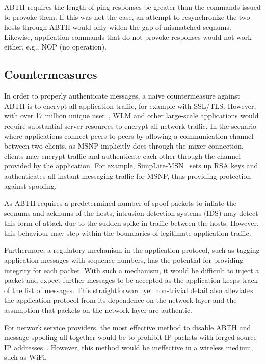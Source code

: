 \documentclass{sig-alternate}
\begin{document}
ABTH requires the length of ping responses be greater than the commands issued to provoke them.
If this was not the case, an attempt to resynchronize the two hosts through ABTH would only widen the gap of mismatched seqnums.
Likewise, application commands that do not provoke responses would not work either, e.g., NOP (no operation).

\subsection{Countermeasures}

In order to properly authenticate messages, a naive countermeasure against ABTH is to encrypt all application traffic, for example with SSL/TLS.
However, with over 17 million unique user~\cite{templeton:spoof}, WLM and other large-scale applications would require substantial server resources to encrypt all network traffic.
In the scenario where applications connect peers to peers by allowing a communication channel between two clients, as MSNP implicitly does through the mixer connection, clients may encrypt traffic and authenticate each other through the channel provided by the application.
For example, SimpLite-MSN~\cite{secway:url} sets up RSA keys and authenticates all instant messaging traffic for MSNP, thus providing protection against spoofing.

As ABTH requires a predetermined number of spoof packets to inflate the seqnums and acknums of the hosts, intrusion detection systems (IDS) may detect this form of attack due to the sudden spike in traffic between the hosts.
However, this behaviour may step within the boundaries of legitimate application traffic.

Furthermore, a regulatory mechanism in the application protocol, such as tagging application messages with sequence numbers, has the potential for providing integrity for each packet.
With such a mechanism, it would be difficult to inject a packet and expect further messages to be accepted as the application keeps track of the list of messages.
This straightforward yet non-trivial detail also alleviates the application protocol from its dependence on the network layer and the assumption that packets on the network layer are authentic.

For network service providers, the most effective method to disable ABTH and message spoofing all together would be to prohibit IP packets with forged source IP addresses~\cite{templeton:spoof}.
However, this method would be ineffective in a wireless medium, such as WiFi.
\end{document}
